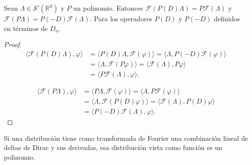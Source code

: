 \begin{teorema}\label{thm:d01}
Sean $\Lambda\in \mathcal{S}'(\mathds{R}^{d})$ y $P$ un polinomio. Entonces $\mathcal{F}(P(D)\Lambda )= P\mathcal{F}(\Lambda)$ y $\mathcal{F}(P\Lambda)= P (-D) \mathcal{F}(\Lambda)$. Para los operadores $P(D)$ y $P(-D)$ definidos en términos de $D_{\alpha}$.
\end{teorema}
\begin{proof}
\begin{align}
\langle \mathcal{F}(P(D)\Lambda), \varphi \rangle & = \langle P(D)\Lambda, \mathcal{F}(\varphi)\rangle = \langle \Lambda, P(-D)\mathcal{F}(\varphi) \rangle \\
 & = \langle \Lambda, \mathcal{F}(P\varphi) \rangle = \langle \mathcal{F}(\Lambda), P\varphi \rangle \\ & = \langle P\mathcal{F}(\Lambda),\varphi \rangle.
\end{align}

\begin{align}
\langle \mathcal{F}(P\Lambda), \varphi \rangle & = \langle P\Lambda, \mathcal{F}(\varphi)\rangle = \langle \Lambda, P \mathcal{F}(\varphi)\rangle \\
 & = \langle \Lambda, \mathcal{F}(P(D)\varphi) \rangle = \langle \mathcal{F}(\Lambda), P(D)\varphi \rangle \\ & = \langle P(-D)\mathcal{F}(\Lambda),\varphi \rangle.
\end{align}


\end{proof}
\begin{lema}\label{lm:d02}
Si una distribución tiene como transformada de Fourier una combinación lineal de deltas de Dirac y sus derivadas, esa distribución vista como función es un polinomio. 
\end{lema}
